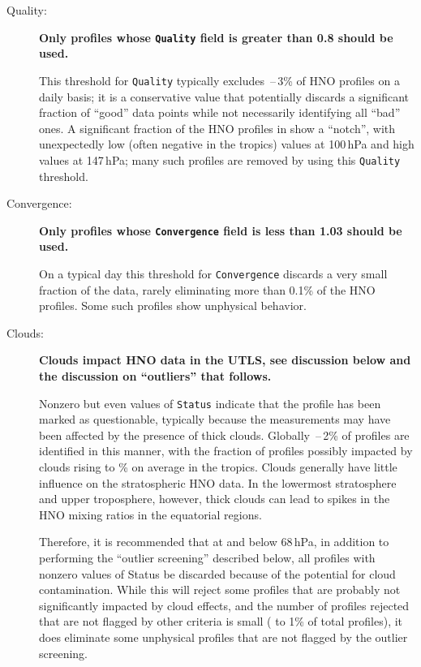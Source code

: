 \documentclass[11pt,draft]{report}
\newcommand{\screeningrule}[1]{\textbf{#1}\par}
\newcommand{\qualityrule}[1]{\screeningrule{Only
    profiles whose \texttt{Quality} field is greater than #1 should be used.}}
\newcommand{\convergencerule}[1]{\screeningrule{Only profiles whose
    \texttt{Convergence} field is less than #1 should be used.}}
\begin{document}
\begin{description}
\item[Quality:] \qualityrule{0.8} This threshold for \texttt{Quality}
  typically excludes \,--\,3\% of HNO profiles on a
  daily basis; it is a conservative value that potentially discards a
  significant fraction of ``good'' data points while not necessarily
  identifying all ``bad'' ones.  A significant fraction of the HNO
  profiles in \thisv show a ``notch'', with unexpectedly low (often
  negative in the tropics) values at 100\,hPa and high values at
  147\,hPa; many such profiles are removed by using this
  \texttt{Quality} threshold.

\item[Convergence:] \convergencerule{1.03} On a typical day this
  threshold for \texttt{Convergence} discards a very small fraction of
  the data, rarely eliminating more than 0.1\% of the HNO profiles.
  Some such profiles show unphysical behavior.

\item[Clouds:] \screeningrule{Clouds impact HNO data in the UTLS,
    see discussion below and the discussion on ``outliers'' that
    follows.}  Nonzero but even values of \texttt{Status} indicate that
  the profile has been marked as questionable, typically because the
  measurements may have been affected by the presence of thick clouds.
  Globally \,--\,2\% of profiles are identified in this
  manner, with the fraction of profiles possibly impacted by clouds
  rising to \% on average in the tropics.  Clouds
  generally have little influence on the stratospheric HNO data.  In
  the lowermost stratosphere and upper troposphere, however, thick
  clouds can lead to spikes in the HNO mixing ratios in the
  equatorial regions.

  Therefore, it is recommended that at and below 68\,hPa, in addition to
  performing the ``outlier screening'' described below, all profiles
  with nonzero values of Status be discarded because of the potential
  for cloud contamination.  While this will reject some profiles that
  are probably not significantly impacted by cloud effects, and the
  number of profiles rejected that are not flagged by other criteria is
  small ( to 1\% of total profiles), it does eliminate
  some unphysical profiles that are not flagged by the outlier
  screening.


\end{description}
\end{document}
